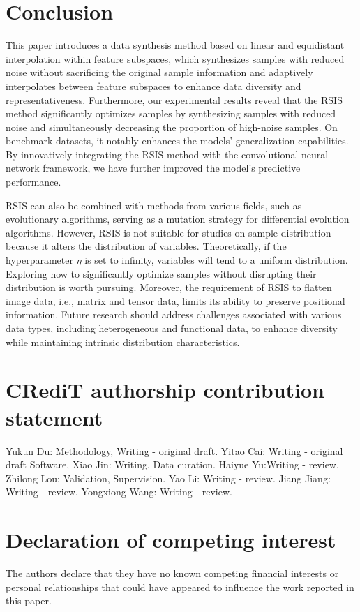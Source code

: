 \documentclass[final,3p,times]{elsarticle}
\begin{document}

\section{Conclusion}
This paper introduces a data synthesis method based on linear and 
equidistant interpolation within feature subspaces, which 
synthesizes samples with reduced noise without sacrificing 
the original sample information and adaptively interpolates 
between feature subspaces to enhance data diversity and 
representativeness. Furthermore, our experimental results reveal 
that the RSIS method significantly optimizes samples by 
synthesizing samples with reduced noise and simultaneously 
decreasing the proportion of high-noise samples. On benchmark 
datasets, it notably enhances the models' generalization 
capabilities. By innovatively integrating the RSIS method with 
the convolutional neural network framework, we have further 
improved the model's predictive performance.

{RSIS can also be combined with methods from various fields, such as evolutionary algorithms, serving as a mutation strategy for differential evolution algorithms.} However, RSIS is not suitable for studies on sample distribution because it alters 
the distribution of variables. Theoretically, if {the}
hyperparameter $\eta$ is set to infinity, variables will 
tend to a uniform distribution. Exploring how to significantly 
optimize samples without disrupting their distribution is worth 
pursuing. {Moreover, the requirement of RSIS to flatten image data, i.e., matrix and tensor data, limits its ability to preserve positional information. Future research should address challenges associated with various data types, including heterogeneous and functional data, to enhance diversity while maintaining intrinsic distribution characteristics.}



\section*{CRediT authorship contribution statement}
Yukun Du: Methodology, Writing - original draft. Yitao Cai: Writing - original draft
Software,  Xiao Jin: Writing, Data curation. Haiyue Yu:Writing - review. Zhilong Lou: Validation, Supervision. Yao Li: Writing - review. Jiang Jiang: Writing - review. Yongxiong Wang: Writing - review. 

\section*{Declaration of competing interest}
The authors declare that they have no known competing financial interests or personal relationships that could have appeared to
influence the work reported in this paper.
\end{document}
